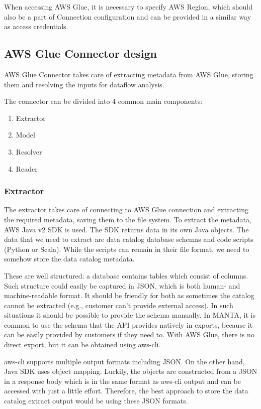When accessing AWS Glue, it is necessary to specify AWS Region, which should also be a part of Connection configuration and can be provided in a similar way as access credentials.

\subsection{AWS Glue Connector design}
AWS Glue Connector takes care of extracting metadata from AWS Glue, storing them and resolving the inputs for dataflow analysis.

The connector can be divided into 4 common main components:
\begin{enumerate}
    \item Extractor
    \item Model
    \item Resolver
    \item Reader
\end{enumerate}


\subsubsection{Extractor}
The extractor takes care of connecting to AWS Glue connection and extracting the required metadata, saving them to the file system. To extract the metadata, AWS Java v2 SDK is used. The SDK returns data in its own Java objects. The data that we need to extract are data catalog database schemas and code scripts (Python or Scala). While the scripts can remain in their file format, we need to somehow store the data catalog metadata.

These are well structured: a database contains tables which consist of columns. Such structure could easily be captured in JSON, which is both human- and machine-readable format. It should be friendly for both as sometimes the catalog cannot be extracted (e.g., customer can’t provide external access). In such situations it should be possible to provide the schema manually. In MANTA, it is common to use the schema that the API provides natively in exports, because it can be easily provided by customers if they need to. With AWS Glue, there is no direct export, but it can be obtained using aws-cli.

aws-cli supports multiple output formats including JSON. On the other hand, Java SDK uses object mapping. Luckily, the objects are constructed from a JSON in a response body which is in the same format as aws-cli output and can be accessed with just a little effort. Therefore, the best approach to store the data catalog extract output would be using these JSON formats.


